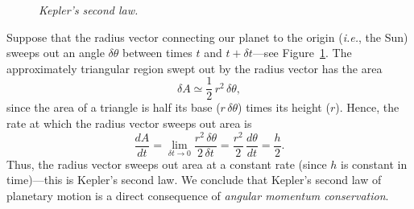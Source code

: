 \begin{figure}
\epsfysize=1.5in
\centerline{}
\caption{\em Kepler's second law.}\label{area}
\end{figure}

Suppose that the radius vector connecting our planet to the origin ({\em i.e.}, the Sun) sweeps
out an angle $\delta\theta$ between times $t$ and $t+\delta t$---see Figure~\ref{area}. The approximately triangular region swept out by the radius vector has the area
\begin{equation}
\delta A \simeq \frac{1}{2}\,r^2\,\delta\theta,
\end{equation}
since the area of a triangle is half its base ($r\,\delta\theta$) times its
height ($r$). Hence, the rate at which the radius vector sweeps out area
is
\begin{equation}\label{e6.40}
\frac{dA}{dt} = \lim_{\delta t\rightarrow 0}\frac{r^2\,\delta\theta}{2\,\delta{t}}= \frac{r^2}{2}\,\frac{d\theta}{dt} = \frac{h}{2}.
\end{equation}
Thus, the radius vector sweeps out area at a constant rate (since $h$ is
constant in time)---this is Kepler's second law. We conclude that Kepler's
second law of planetary motion is a direct consequence of {\em angular
momentum conservation}.

